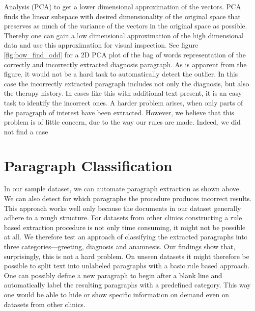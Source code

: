 Analysis (PCA) to get a lower dimensional approximation of the vectors. PCA finds the linear
subspace with desired dimensionality of the original space that preserves as much of the variance of the vectors in the original space as possible. Thereby one can gain a low dimensional approximation of the high dimensional data and use this approximation for visual inspection.
See figure \ref{fig:bow_find_odd} for a 2D PCA plot of the bag of words representation
of the correctly and incorrectly extracted diagnosis paragraph. As is apparent from the figure, it would not be a
hard task to automatically detect the outlier. In this case the incorrectly
extracted paragraph includes not only the diagnosis, but also the
therapy history. In cases like this with additional text present, it is an easy task to
identify the incorrect ones. A harder problem arises, when only parts
of the paragraph of interest have been extracted. However, we believe
that this problem is of little concern, due to the way our rules are made.
Indeed, we did not find a case





\section{Paragraph Classification}
In our sample dataset, we can automate paragraph extraction as shown above. We can also detect for which paragraphs the procedure produces incorrect results. This approach works well only because the documents in our dataset generally adhere to a rough structure. For datasets from other clinics constructing a rule based extraction procedure is not only time consuming, it might not be possible at all. We therefore test an approach of classifying the extracted paragraphs into three categories---greeting, diagnosis and anamnesis. Our findings show that, surprisingly, this is not a hard problem. On unseen datasets it might therefore be possible to split text into unlabeled paragraphs with a basic rule based approach. One can possibly define a new paragraph to begin after a blank line and automatically label the resulting paragraphs with a predefined category. This way one would be able to hide or show specific information on demand even on datasets from other clinics.

